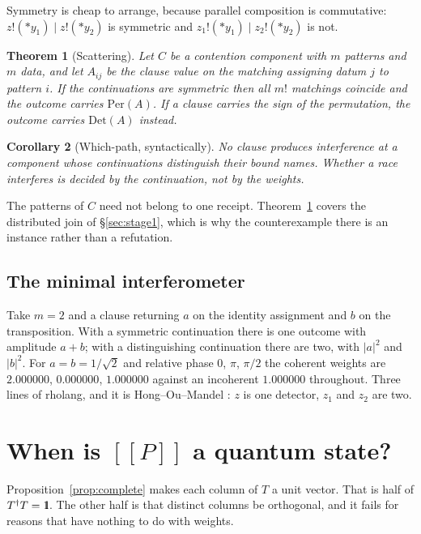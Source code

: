 \documentclass[11pt,a4paper]{article}
\newcommand{\Id}{\mathrm{1}\hspace{-0.30em}\mathrm{l}}
\theoremstyle{plain}
\newtheorem{theorem}{Theorem}[section]
\newtheorem{corollary}[theorem]{Corollary}
\theoremstyle{definition}
\theoremstyle{remark}
\newcommand{\sem}[1]{[\![#1]\!]}
\newcommand{\Per}{\mathrm{Per}}
\newcommand{\Det}{\mathrm{Det}}
\begin{document}
Symmetry is cheap to arrange, because parallel composition is commutative:
$z!(*y_1) \mid z!(*y_2)$ is symmetric and $z_1!(*y_1) \mid z_2!(*y_2)$ is not.

\begin{theorem}[Scattering]\label{thm:scattering}
Let $C$ be a contention component with $m$ patterns and $m$ data, and let
$A_{ij}$ be the clause value on the matching assigning datum $j$ to pattern $i$.
If the continuations are symmetric then all $m!$ matchings coincide and the
outcome carries $\Per(A)$. If a clause carries the sign of the permutation, the
outcome carries $\Det(A)$ instead.
\end{theorem}

\begin{corollary}[Which-path, syntactically]\label{cor:whichpath}
No clause produces interference at a component whose continuations distinguish
their bound names. Whether a race interferes is decided by the continuation, not
by the weights.
\end{corollary}

The patterns of $C$ need not belong to one receipt. Theorem~\ref{thm:scattering}
covers the distributed join of \S\ref{sec:stage1}, which is why the
counterexample there is an instance rather than a refutation.

\subsection{The minimal interferometer}\label{ssec:interferometer}

Take $m = 2$ and a clause returning $a$ on the identity assignment and $b$ on
the transposition. With a symmetric continuation there is one outcome with
amplitude $a+b$; with a distinguishing continuation there are two, with
$|a|^2$ and $|b|^2$. For $a = b = 1/\sqrt2$ and relative phase $0$, $\pi$,
$\pi/2$ the coherent weights are $2.000000$, $0.000000$, $1.000000$ against an
incoherent $1.000000$ throughout. Three lines of rholang, and it is
Hong--Ou--Mandel \cite{HOM}: $z$ is one detector, $z_1$ and $z_2$ are two.

\section{When is $\sem{P}$ a quantum state?}\label{sec:fragment}

Proposition~\ref{prop:complete} makes each column of $T$ a unit vector. That is
half of $T^{\dagger}T = \Id$. The other half is that distinct columns be
orthogonal, and it fails for reasons that have nothing to do with weights.
\end{document}

